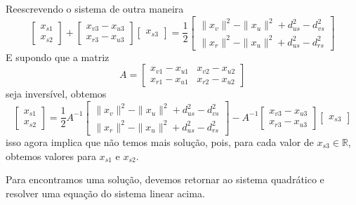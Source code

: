 \documentclass[a4paper,12pt]{article}
\begin{document}
	Reescrevendo o sistema de outra maneira
	$$
	\begin{bmatrix}
	x_{s1}\\
	x_{s2}
	\end{bmatrix} +
	\begin{bmatrix}
	x_{v3} - x_{u3}\\
	x_{r3} - x_{u3}
	\end{bmatrix}
	\begin{bmatrix}
	x_{s3}
	\end{bmatrix} =
	\frac{1}{2} \begin{bmatrix}
	\|x_{v}\|^{2} - \|x_{u}\|^{2} + d_{us}^{2} - d_{vs}^{2}\\
	\|x_{r}\|^{2} - \|x_{u}\|^{2} + d_{us}^{2} - d_{rs}^{2}
	\end{bmatrix}
	$$
	E supondo que a matriz
	$$
	A = \begin{bmatrix}
	x_{v1} - x_{u1} & x_{v2} - x_{u2}\\
	x_{r1} - x_{u1} & x_{r2} - x_{u2}
	\end{bmatrix}
	$$
	seja inversível, obtemos
	$$
	\begin{bmatrix}
	x_{s1}\\
	x_{s2}
	\end{bmatrix} =
	\frac{1}{2} A^{-1} \begin{bmatrix}
	\|x_{v}\|^{2} - \|x_{u}\|^{2} + d_{us}^{2} - d_{vs}^{2}\\
	\|x_{r}\|^{2} - \|x_{u}\|^{2} + d_{us}^{2} - d_{rs}^{2}
	\end{bmatrix} -
	A^{-1}\begin{bmatrix}
	x_{v3} - x_{u3}\\
	x_{r3} - x_{u3}
	\end{bmatrix}
	\begin{bmatrix}
	x_{s3}
	\end{bmatrix}
	$$
	isso agora implica que não temos mais solução, pois, para cada valor de $x_{s3} \in\mathbb{R}$, obtemos valores para $x_{s1}$ e $x_{s2}$.
	
	Para encontramos uma solução, devemos retornar ao sistema quadrático e resolver uma equação do sistema linear acima.
	
\end{document}

